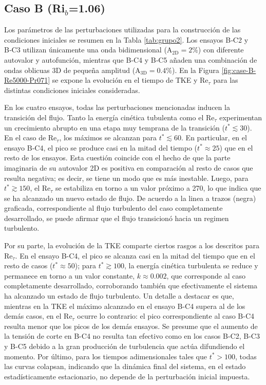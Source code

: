 \subsection{Caso B (Ri$_b$=1.06)}

Los parámetros de las perturbaciones utilizadas para la construcción de las condiciones iniciales se resumen en la Tabla \ref{tab:grupo2}. Los ensayos B‑C2 y B‑C3 utilizan únicamente una onda bidimensional ($\text{A}_{\text{2D}}=2 \%$) con diferente autovalor y autofunción, mientras que B‑C4 y B‑C5 añaden una combinación de ondas oblicuas 3D de pequeña amplitud ($\text{A}_{\text{3D}}= 0\text{.}4\%$). En la Figura \ref{fig:case-B-Re5000-Pr071} se expone la evolución en el tiempo de TKE y Re$_{\tau}$ para las distintas condiciones iniciales consideradas.  

En los cuatro ensayos, todas las perturbaciones mencionadas inducen la transición del flujo. Tanto la energía cinética tubulenta como el Re$_{\tau}$ experimentan un crecimiento abrupto en una etapa muy temprana de la transición ($t^*\lesssim 30$). En el caso de Re$_{\tau}$, los máximos se alcanzan para $t^*\lesssim 60$. En particular, en el ensayo B‑C4, el pico se produce casi en la mitad del tiempo ($t^*\approx 25$) que en el resto de los ensayos. Esta cuestión coincide con el hecho de que la parte imaginaria de su autovalor 2D es positiva en comparación al resto de casos que resulta negativa; es decir, se tiene un modo que es más inestable. Luego, para $t^* \gtrsim 150$, el Re$_{\tau}$ se estabiliza en torno a un valor próximo a 270, lo que indica que se ha alcanzado un nuevo estado de flujo. De acuerdo a la linea a trazos (negra) graficada, correspondiente al flujo turbulento del caso completamente desarrollado, se puede afirmar que el flujo transicionó hacia un regimen turbulento.  

Por su parte, la evolución de la TKE comparte ciertos rasgos a los descritos para Re$_{\tau}$. En el ensayo B-C4, el pico se alcanza casi en la mitad del tiempo que en el resto de casos ($t^*\approx 50$); para $t^* \gtrsim 100$, la energía cinética turbulenta se reduce y permanece en torno a un valor constante, $k \approx 0\text{.}002$, que corresponde al caso completamente desarrollado, corroborando también que efectivamente el sistema ha alcanzado un estado de flujo turbulento. Un detalle a destacar es que, mientras en la TKE el máximo alcanzado en el ensayo B-C4 supera al de los demás casos, en el Re$_{\tau}$ ocurre lo contrario: el pico correspondiente al caso B-C4 resulta menor que los picos de los demás ensayos. Se presume que el aumento de la tensión de corte en B-C4 no resulta tan efectivo como en los casos B-C2, B-C3 y B-C5 debido a la gran producción de turbulencia que actúa difundiendo el momento. Por último, para los tiempos adimensionales tales que $t^* > 100$, todas las curvas colapsan, indicando que la dinámica final del sistema, en el estado estadísticamente estacionario, no depende de la perturbación inicial impuesta. 


